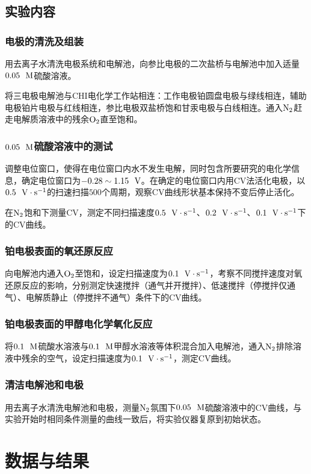 \documentclass[12pt]{article}
\begin{document}
    	 \subsection{实验内容\citealp{physchemlab}}
			\subsubsection{电极的清洗及组装}
用去离子水清洗电极系统和电解池，向参比电极的二次盐桥与电解池中加入适量$0.05 \ \ {\rm M}$硫酸溶液。\par 
将三电极电解池与CHI电化学工作站相连：工作电极铂圆盘电极与绿线相连，辅助电极铂片电极与红线相连，参比电极双盐桥饱和甘汞电极与白线相连。通入$\rm N_{2}$赶走电解质溶液中的残余$\rm O_{2}$直至饱和。
\subsubsection{$0.05 \ \ {\rm M}$硫酸溶液中的测试}
调整电位窗口，使得在电位窗口内水不发生电解，同时包含所要研究的电化学信息，确定电位窗口为$-0.28\sim 1.15\ \ {\rm V}$。在确定的电位窗口内用CV法活化电极，以$0.5\ \ {\rm V\cdot s^{-1}}$的扫速扫描$500$个周期，观察CV曲线形状基本保持不变后停止活化。\par 
在$\rm N_{2}$饱和下测量CV，测定不同扫描速度$0.5\ \ {\rm V\cdot s^{-1}}$、$0.2\ \ {\rm V\cdot s^{-1}}$、$0.1\ \ {\rm V\cdot s^{-1}}$下的CV曲线。
			\subsubsection{铂电极表面的氧还原反应}
向电解池内通入$\rm O_{2}$至饱和，设定扫描速度为$0.1\ \ {\rm V\cdot s^{-1}}$，考察不同搅拌速度对氧还原反应的影响，分别测定快速搅拌（通气并开搅拌）、低速搅拌（停搅拌仅通气）、电解质静止（停搅拌不通气）条件下的CV曲线。
			\subsubsection{铂电极表面的甲醇电化学氧化反应}
将$0.1\ \ {\rm M}$硫酸水溶液与$0.1\ \ {\rm M}$甲醇水溶液等体积混合加入电解池，通入$\rm N_{2}$排除溶液中残余的空气，设定扫描速度为$0.1\ \ {\rm V\cdot s^{-1}}$，测定CV曲线。
	\subsubsection{清洁电解池和电极}
用去离子水清洗电解池和电极，测量$\rm N_{2}$氛围下$0.05\ \ {\rm M}$硫酸溶液中的CV曲线，与实验开始时相同条件测量的曲线一致后，将实验仪器复原到初始状态。
\vbox{}
 \section{数据与结果}
\end{document}

